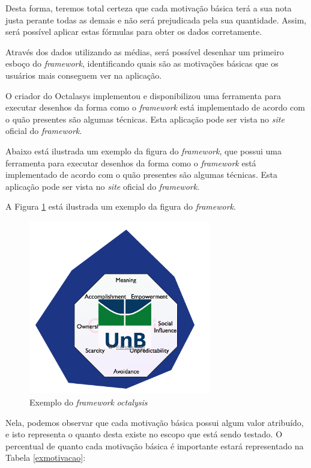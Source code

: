 Desta forma, teremos total certeza que cada motivação básica terá a sua nota justa perante todas as demais e não será prejudicada
pela sua quantidade. Assim, será possível aplicar estas fórmulas para obter os dados corretamente.

Através dos dados utilizando as médias, será possível desenhar um primeiro esboço do \textit{framework}, identificando quais são as motivações
básicas que os usuários mais conseguem ver na aplicação. 

O criador do Octalasys implementou e disponibilizou uma ferramenta para executar desenhos da forma como o \textit{framework} está implementado
de acordo com o quão presentes são algumas técnicas. Esta aplicação pode ser vista no \textit{site} oficial do \textit{framework}.

Abaixo está ilustrada um exemplo da figura do \textit{framework},  que possui uma ferramenta para executar desenhos da forma como o \textit{framework} está implementado
de acordo com o quão presentes são algumas técnicas. Esta aplicação pode ser vista no \textit{site} oficial do \textit{framework}.

A Figura \ref{fig:exoctalysis} está ilustrada um exemplo da figura do \textit{framework}.

 \begin{figure}[h]
     \centering

     \includegraphics[width=300px, scale=1]{figuras/exoctalysis}
     \caption{Exemplo do \textit{framework} \textit{octalysis}}

     \label{fig:exoctalysis}
 \end{figure}


Nela, podemos observar que cada motivação básica possui algum valor atribuído, e isto representa o quanto desta existe no escopo que
está sendo testado. O percentual de quanto cada motivação básica é importante estará representado na Tabela \ref{exmotivacao}:

